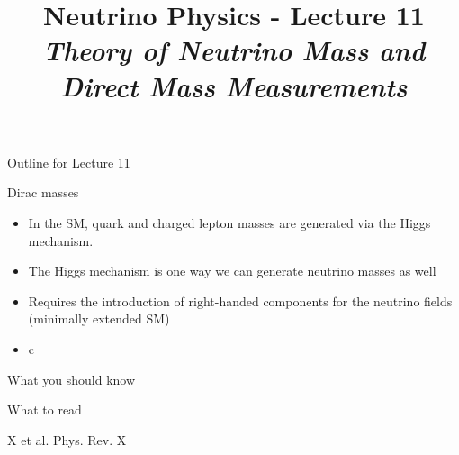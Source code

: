 \renewcommand{\thislecture}{11 }

%
%

\title[Neutrino Physics / Lecture \thislecture]
{
  {\huge \color{yellow} Neutrino Physics - Lecture \thislecture} \\
  {\it Theory of Neutrino Mass and Direct Mass Measurements}\\
}



\begin{frame}[plain]
  \titlepage
\end{frame}

%
%

\begin{frame}{Outline for Lecture \thislecture}


\end{frame}

%
%

\begin{frame}{Dirac masses}

\begin{itemize}
\item In the SM, quark and charged lepton masses are generated via the Higgs mechanism.
\item The Higgs mechanism is one way we can generate neutrino masses as well                       
\item Requires the introduction of right-handed components for the neutrino fields (minimally extended SM)
\item c
\end{itemize}
\end{frame}



%
%

\begin{frame}{What you should know}

\end{frame}


%
%

\begin{frame}{What to read}

\begin{itemize}
{\scriptsize

\vspace{0.1cm}
\item
X et al.
Phys. Rev. X

}
\end{itemize}

\end{frame}

